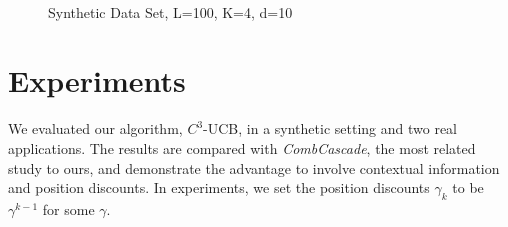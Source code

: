 \documentclass{article}
\begin{document}
\begin{figure}
	\centering
	\\
	\caption{Synthetic Data Set, L=100, K=4, d=10}
	\label{fig:synthetic} %
\end{figure}



\section{Experiments}

We evaluated our algorithm, $C^3$-UCB, in a synthetic setting and two real applications. The results are compared with {\it CombCascade}, the most related study to ours, and demonstrate the advantage to involve contextual information and position discounts. In experiments, we set the position discounts $\gamma_k$ to be $\gamma^{k-1}$ for some $\gamma$. 
\end{document}
